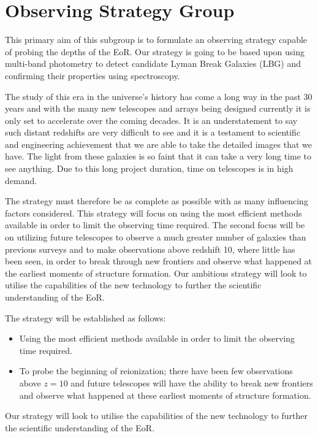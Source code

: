 \section{Observing Strategy Group} %
\label{sec:observing_strategy_group}
	This primary aim of this subgroup is to formulate an observing strategy capable of probing the depths of the EoR. Our strategy is going to be based upon using multi-band photometry to detect candidate Lyman Break Galaxies (LBG) and confirming their properties using spectroscopy.

	The study of this era in the universe's history has come a long way in the past 30 years and with the many new telescopes and arrays being designed currently it is only set to accelerate over the coming decades. It is an understatement to say such distant redshifts are very difficult to see and it is a testament to scientific and engineering achievement that we are able to take the detailed images that we have. The light from these galaxies is so faint that it can take a very long time to see anything. Due to this long project duration, time on telescopes is in high demand.

	The strategy must therefore be as complete as possible with as many influencing factors considered. This strategy will focus on using the most efficient methods available in order to limit the observing time required. The second focus will be on utilizing future telescopes to observe a much greater number of galaxies than previous surveys and to make observations above redshift 10, where little has been seen, in order to break through new frontiers and observe what happened at the earliest moments of structure formation. Our ambitious strategy will look to utilise the capabilities of the new technology to further the scientific understanding of the EoR.

	The strategy will be established as follows:
	\begin{itemize}
		\item Using the most efficient methods available in order to limit the observing time required.
		\item To probe the beginning of reionization; there have been few observations above $z=10$ and future telescopes will have the ability to break new frontiers and observe what happened at these earliest moments of structure formation.
	\end{itemize}

	Our strategy will look to utilise the capabilities of the new technology to further the scientific understanding of the EoR.

